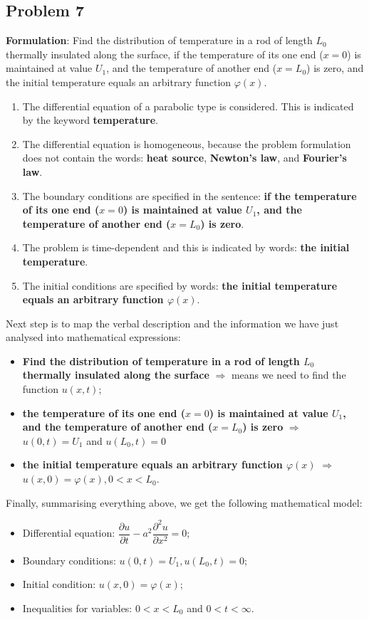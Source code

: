 \subsection{Problem 7}

{\bfseries Formulation}: Find the distribution of temperature in a rod of length $L_{0}$ thermally insulated along the surface, if the temperature of its one end ($x=0$) is maintained at value $U_{1}$, and the temperature of another end ($x=L_{0}$) is zero, and the initial temperature equals an arbitrary function $\varphi(x)$.
\begin{enumerate}
\item The differential equation of a parabolic type is considered. This is indicated by the keyword {\bfseries temperature}.
\item The differential equation is homogeneous, because the problem formulation does not contain the words: {\bfseries heat source}, {\bfseries Newton's law}, and {\bfseries Fourier's law}.
\item The boundary conditions are specified in the sentence: {\bfseries if the temperature of its one end ($x=0$) is maintained at value $U_{1}$, and the temperature of another end ($x=L_{0}$) is zero}.
\item The problem is time-dependent and this is indicated by words: {\bfseries the initial temperature}.
\item The initial conditions are specified by words: {\bfseries the initial temperature equals an arbitrary function $\varphi(x)$}.
\end{enumerate}
Next step is to map the verbal description and the information we have just analysed into mathematical expressions:
\begin{itemize}
\item {\bfseries Find the distribution of temperature in a rod of length $L_{0}$ thermally insulated along the surface} $\Longrightarrow$ means we need to find the function $u(x,t)$;
\item {\bfseries the temperature of its one end ($x=0$) is maintained at value $U_{1}$, and the temperature of another end ($x=L_{0}$) is zero} $\Longrightarrow$ $u(0,t)=U_{1}$ and $u(L_{0},t)=0$
\item {\bfseries the initial temperature equals an arbitrary function $\varphi(x)$} $\Longrightarrow$ $u(x,0)=\varphi(x), 0<x<L_{0}$.
\end{itemize}
Finally, summarising everything above, we get the following mathematical model:
\begin{itemize}
\item Differential equation: $\dfrac{\partial u}{\partial t} - a^{2}\dfrac{\partial^{2} u}{\partial x^{2}}=0$;
\item Boundary conditions: $u(0,t)=U_{1}, u(L_{0},t)=0$;
\item Initial condition: $u(x,0)=\varphi(x)$;
\item Inequalities for variables: $0<x<L_{0}$ and $0<t<\infty$.
\end{itemize}

